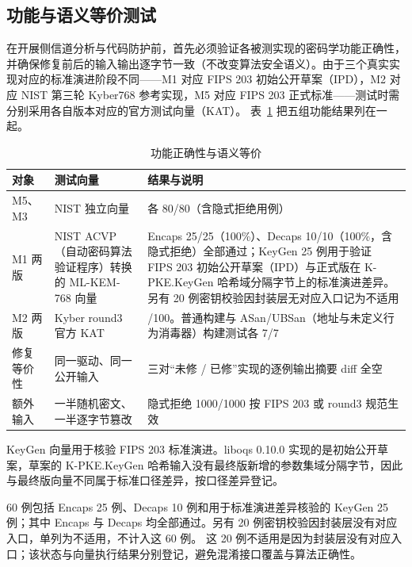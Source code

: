 \subsection{功能与语义等价测试}

在开展侧信道分析与代码防护前，首先必须验证各被测实现的密码学功能正确性，并确保修复前后的输入输出逐字节一致（不改变算法安全语义）。由于三个真实实现对应的标准演进阶段不同——M1 对应 FIPS 203 初始公开草案（IPD），M2 对应 NIST 第三轮 Kyber768 参考实现，M5 对应 FIPS 203 正式标准——测试时需分别采用各自版本对应的官方测试向量（KAT）。\cite{fips203}
表~\ref{tab:function} 把五组功能结果列在一起。%

\begin{table}[H]
\centering
\caption{功能正确性与语义等价}
\label{tab:function}
{\small
\begin{tabularx}{\textwidth}{|>{\raggedright\arraybackslash}p{2.5cm}|>{\raggedright\arraybackslash}p{3.5cm}|>{\raggedright\arraybackslash}X|}
\hline
对象 & 测试向量 & 结果与说明 \\
\hline
M5、M3 & NIST 独立向量 & 各 80/80（含隐式拒绝用例） \\
\hline
M1 两版 & NIST ACVP（自动密码算法验证程序）转换的 ML-KEM-768 向量 & Encaps 25/25（100\%）、Decaps 10/10（100\%，含隐式拒绝）全部通过；KeyGen 25 例用于验证 FIPS 203 初始公开草案（IPD）与正式版在 K-PKE.KeyGen 哈希域分隔字节上的标准演进差异。另有 20 例密钥校验因封装层无对应入口记为不适用 \\
\hline
M2 两版 & Kyber round3 官方 KAT & 100/100。普通构建与 ASan/UBSan（地址与未定义行为消毒器）构建测试各 7/7 \\
\hline
修复等价性 & 同一驱动、同一公开输入 & 三对“未修 / 已修”实现的逐例输出摘要 diff 全空 \\
\hline
额外输入 & 一半随机密文、一半逐字节篡改 & 隐式拒绝 1000/1000 按 FIPS 203 或 round3 规范生效 \\
\hline
\end{tabularx}
}
\end{table}

KeyGen 向量用于核验 FIPS 203 标准演进。liboqs 0.10.0 实现的是初始公开草案，草案的 K-PKE.KeyGen 哈希输入没有最终版新增的参数集域分隔字节，因此与最终版向量不同属于标准口径差异，按口径差异登记。

60 例包括 Encaps 25 例、Decaps 10 例和用于标准演进差异核验的 KeyGen 25 例；其中 Encaps 与 Decaps 均全部通过。另有 20 例密钥校验因封装层没有对应入口，单列为不适用，不计入这 60 例。
这 20 例不适用是因为封装层没有对应入口；该状态与向量执行结果分别登记，避免混淆接口覆盖与算法正确性。

